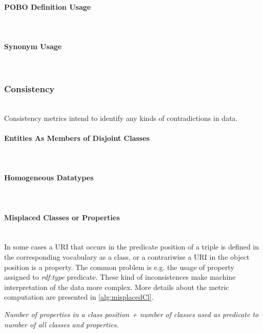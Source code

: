 \paragraph{POBO Definition Usage}~\\ 
\paragraph{Synonym Usage}~\\ 



\subsubsection{Consistency}~\\ 

Consistency metrics intend to identify any kinds of contradictions in data.

\paragraph{Entities As Members of Disjoint Classes}~\\


\paragraph{Homogeneous Datatypes}~\\
 
\paragraph{Misplaced Classes or Properties} ~\\

In some cases a URI that occurs in the predicate position of a triple is defined in the corresponding vocabulary as a class, or a contrariwise a URI in the object position is a property.
The common problem is e.g. the usage of property assigned to \textit{rdf:type} predicate.  
These kind of inconsistences make machine interpretation of the data more complex.
More details about the metric computation are presented in \ref{alg:misplacedCl}.


\begin{mdframed}[style=metricdefinition]
\emph{Number of properties in a class position + number of classes used as predicate to number of all classes and properties.}
\end{mdframed}


